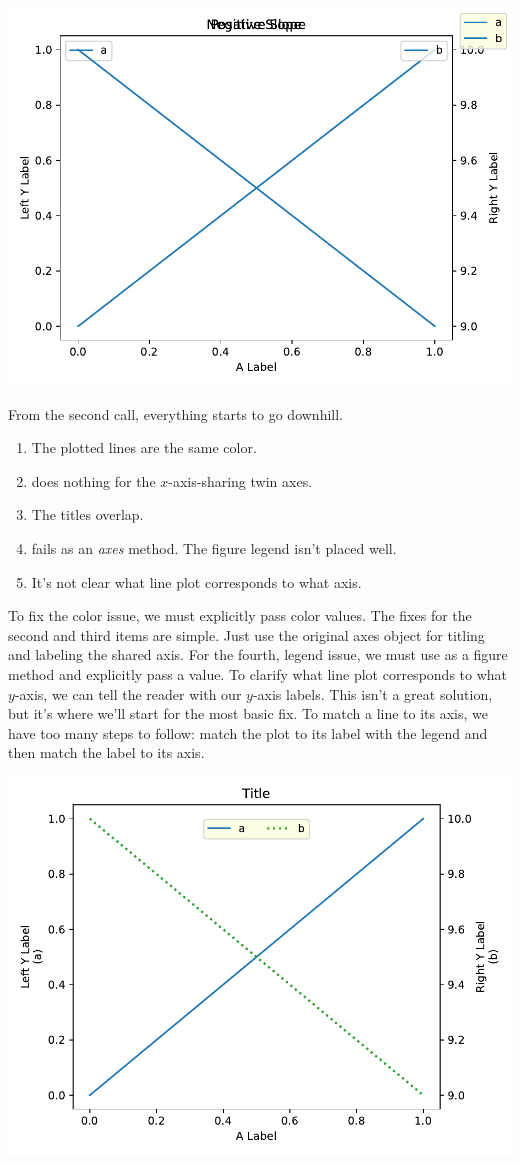 

\begin{center}
    \includegraphics[width = .7\textwidth]{figures/proseplots/dual-bad.pdf}
\end{center}

\noindent From the second  call, everything starts to go downhill. 

\begin{enumerate}
    \item The plotted lines are the same color.
    \item {} does nothing for the $x$-axis-sharing twin axes.
    \item The titles overlap.
    \item {} fails as an \emph{axes} method. The figure legend isn't placed well.
    \item It's not clear what line plot corresponds to what axis.
\end{enumerate}

To fix the color issue, we must explicitly pass color values. The fixes for the second and third items are simple. Just use the original axes object for titling and labeling the shared axis. For the fourth, legend issue, we must use  as a figure method and explicitly pass a  value. To clarify what line plot corresponds to what $y$-axis, we can tell the reader with our $y$-axis labels. This isn't a great solution, but it's where we'll start for the most basic fix. To match a line to its axis, we have too many steps to follow: match the plot to its label with the legend and then match the label to its axis. 

\begin{center}
    \includegraphics[width = .7\textwidth]{figures/proseplots/dual-ok.pdf}
\end{center}

